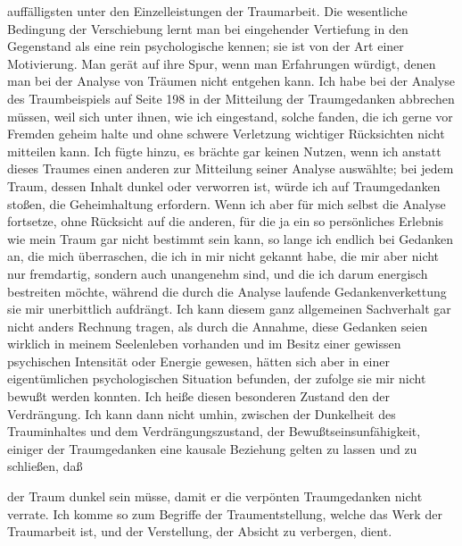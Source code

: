 \documentclass{article}
\begin{document}
        \pstart
        auffälligsten unter den Einzelleistungen der Traumarbeit. Die
               wesentliche Bedingung der Verschiebung lernt man bei eingehender
               Vertiefung in den Gegenstand als eine rein psychologische kennen; sie ist von
               der Art einer Motivierung. Man gerät auf ihre
               Spur, wenn man Erfahrungen würdigt, denen man bei der Analyse von Träumen nicht
               entgehen kann. Ich habe bei der Analyse des Traumbeispiels auf Seite 198 in der
               Mitteilung der Traumgedanken abbrechen müssen, weil sich unter ihnen, wie
               ich eingestand, solche fanden, die ich gerne vor Fremden geheim halte und ohne
               schwere Verletzung wichtiger Rücksichten nicht mitteilen kann. Ich fügte hinzu,
               es brächte gar keinen Nutzen, wenn ich anstatt dieses Traumes einen anderen zur
                  Mitteilung seiner Analyse auswählte; bei jedem Traum, dessen
               Inhalt dunkel oder verworren ist, würde ich auf Traumgedanken stoßen, die
               Geheimhaltung erfordern. Wenn ich aber für mich selbst die Analyse fortsetze,
               ohne Rücksicht auf die anderen, für die ja ein so persönliches Erlebnis wie mein
               Traum gar nicht bestimmt sein kann, so lange ich endlich bei Gedanken an,
               die mich überraschen, die ich in mir nicht gekannt habe, die mir aber nicht
                  nur fremdartig, sondern auch unangenehm sind, und die ich darum energisch bestreiten möchte, während die
               durch die Analyse laufende Gedankenverkettung sie mir unerbittlich aufdrängt.
               Ich kann diesem ganz allgemeinen Sachverhalt gar nicht anders Rechnung tragen,
               als durch die Annahme, diese Gedanken seien wirklich in meinem Seelenleben
               vorhanden und im Besitz einer gewissen psychischen Intensität oder Energie
               gewesen, hätten sich aber in einer eigentümlichen psychologischen Situation
               befunden, der zufolge sie mir nicht bewußt werden
               konnten. Ich heiße diesen besonderen Zustand den der Verdrängung. Ich kann dann nicht umhin, zwischen der Dunkelheit des
               Trauminhaltes und dem Verdrängungszustand, der Bewußtseinsunfähigkeit, einiger der Traumgedanken eine kausale
               Beziehung gelten zu lassen und zu schließen, daß
        \pend
    
         
            
            
            
        \pstart
        der Traum dunkel sein müsse, damit er die
                  verpönten Traumgedanken nicht verrate. Ich komme so zum Begriffe der Traumentstellung, welche das Werk der Traumarbeit
               ist, und der Verstellung, der Absicht zu
               verbergen, dient.
        \pend
    
\end{document}
